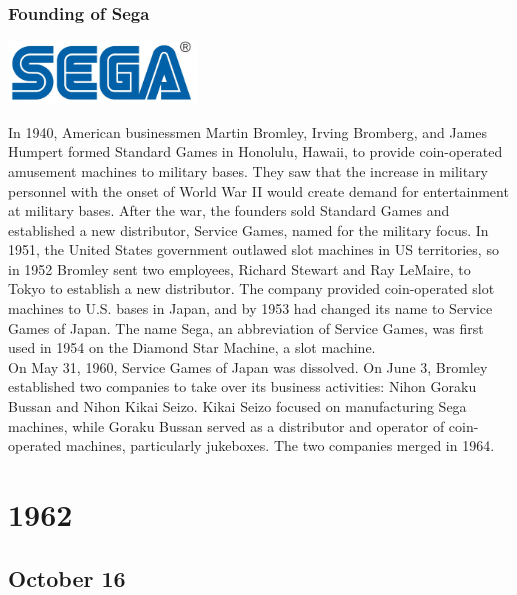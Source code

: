 \documentclass[11pt]{report}
\begin{document}
\subsection{Founding of Sega}
\vspace{2mm}\begin{center}\includegraphics[width=5cm]{./img/segaLogo.jpg}\end{center}
In 1940, American businessmen Martin Bromley, Irving Bromberg, and James Humpert formed Standard Games in Honolulu, Hawaii, to provide coin-operated amusement machines to military bases. They saw that the increase in military personnel with the onset of World War II would create demand for entertainment at military bases. After the war, the founders sold Standard Games and established a new distributor, Service Games, named for the military focus. In 1951, the United States government outlawed slot machines in US territories, so in 1952 Bromley sent two employees, Richard Stewart and Ray LeMaire, to Tokyo to establish a new distributor. The company provided coin-operated slot machines to U.S. bases in Japan, and by 1953 had changed its name to Service Games of Japan. The name Sega, an abbreviation of Service Games, was first used in 1954 on the Diamond Star Machine, a slot machine.\\
\indent On May 31, 1960, Service Games of Japan was dissolved. On June 3, Bromley established two companies to take over its business activities: Nihon Goraku Bussan and Nihon Kikai Seizo. Kikai Seizo focused on manufacturing Sega machines, while Goraku Bussan served as a distributor and operator of coin-operated machines, particularly jukeboxes. The two companies merged in 1964.

\chapter{1962}
\section{October 16}
\end{document}
